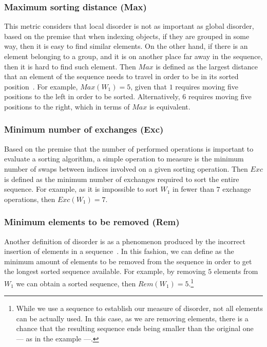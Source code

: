 \subsubsection{Maximum sorting distance (Max)}
This metric considers that local disorder is not as important as global disorder, based on the premise that when indexing objects, if they are grouped in some way, then it is easy to find similar elements. On the other hand, if there is an element belonging to a group, and it is on another place far away in the sequence, then it is hard to find such element. Then $Max$ is defined as the largest distance that an element of the sequence needs to travel in order to be in its sorted position~\cite{Estivill-Castro_Wood_1989}. For example, $Max(W_1) = 5$, given that $1$ requires moving five positions to the left in order to be sorted. Alternatively, $6$ requires moving five positions to the right, which in terms of $Max$ is equivalent.\\

\subsubsection{Minimum number of exchanges (Exc)}
Based on the premise that the number of performed operations is important to evaluate a sorting algorithm, a simple operation to measure is the minimum number of swaps between indices involved on a given sorting operation. Then $Exc$ is defined as the minimum number of exchanges required to sort the entire sequence\cite{Mannila_1985}. For example, as it is impossible to sort $W_1$ in fewer than $7$ exchange operations, then $Exc(W_1)=7$.\\

\subsubsection{Minimum elements to be removed (Rem)}
Another definition of disorder is as a phenomenon produced by the incorrect insertion of elements in a sequence~\cite{10.5555/270146}. In this fashion, we can define as the minimum amount of elements to be removed from the sequence in order to get the longest sorted sequence available. For example, by removing $5$ elements from $W_1$ we can obtain a sorted sequence, then $Rem(W_1) = 5$.\footnote{While we use a sequence to establish our measure of disorder, not all elements can be actually used. In this case, as we are removing elements, there is a chance that the resulting sequence ends being smaller than the original one --- as in the example ---.}

